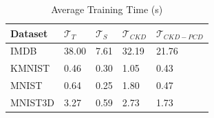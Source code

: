 \begin{table}
\caption{Average Training Time (s)}
\label{tab:training-time}
\begin{tabular}{lllll}
\toprule
Dataset & $\mathcal{T}_T$ & $\mathcal{T}_S$ & $\mathcal{T}_{CKD}$ & $\mathcal{T}_{CKD-PCD}$ \\
\midrule
IMDB & 38.00 & 7.61 & 32.19 & 21.76 \\
KMNIST & 0.46 & 0.30 & 1.05 & 0.43 \\
MNIST & 0.64 & 0.25 & 1.80 & 0.47 \\
MNIST3D & 3.27 & 0.59 & 2.73 & 1.73 \\
\bottomrule
\end{tabular}
\end{table}
